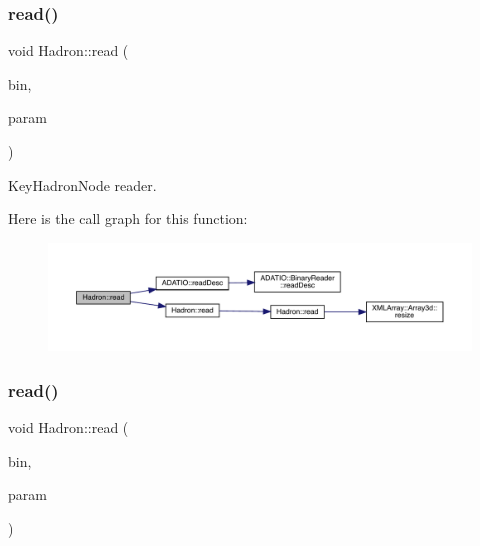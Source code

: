 \subsubsection{\texorpdfstring{read()}{read()}\hspace{0.1cm}{\footnotesize\ttfamily [54/94]}}
{\footnotesize\ttfamily void Hadron\+::read (\begin{DoxyParamCaption}\item[{\mbox{\hyperlink{classADATIO_1_1BinaryReader}{Binary\+Reader}} \&}]{bin,  }\item[{\mbox{\hyperlink{structHadron_1_1KeyHadronNode__t_1_1Quark__t}{Key\+Hadron\+Node\+\_\+t\+::\+Quark\+\_\+t}} \&}]{param }\end{DoxyParamCaption})}



Key\+Hadron\+Node reader. 

Here is the call graph for this function\+:
\nopagebreak
\begin{figure}[H]
\begin{center}
\leavevmode
\includegraphics[width=350pt]{d1/daf/namespaceHadron_a60758467521910899dec197e7fbc0ab4_cgraph}
\end{center}
\end{figure}
\mbox{\label{namespaceHadron_a51412e3f2ebc9c4d67ed1cc397c4d546}} 
\subsubsection{\texorpdfstring{read()}{read()}\hspace{0.1cm}{\footnotesize\ttfamily [55/94]}}
{\footnotesize\ttfamily void Hadron\+::read (\begin{DoxyParamCaption}\item[{\mbox{\hyperlink{classADATIO_1_1BinaryReader}{Binary\+Reader}} \&}]{bin,  }\item[{\mbox{\hyperlink{structHadron_1_1KeyHadronNPartNPtCorr__t}{Key\+Hadron\+N\+Part\+N\+Pt\+Corr\+\_\+t}} \&}]{param }\end{DoxyParamCaption})}



